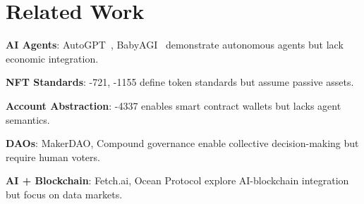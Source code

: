 \section{Related Work}


\textbf{AI Agents}: AutoGPT~\cite{autogpt2023}, BabyAGI~\cite{babyagi2023} demonstrate autonomous agents but lack economic integration.

\textbf{NFT Standards}: \ERC{}-721, \ERC{}-1155 define token standards but assume passive assets.

\textbf{Account Abstraction}: \ERC{}-4337 enables smart contract wallets but lacks agent semantics.

\textbf{DAOs}: MakerDAO, Compound governance enable collective decision-making but require human voters.

\textbf{AI + Blockchain}: Fetch.ai, Ocean Protocol explore AI-blockchain integration but focus on data markets.

